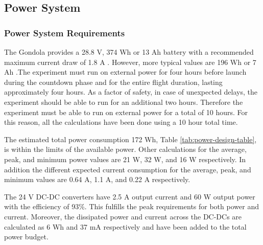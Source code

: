 \pagebreak
\subsection{Power System}

\subsubsection{Power System Requirements}
\begin{centering}
The Gondola provides a 28.8 V, 374 Wh or 13 Ah battery with a recommended maximum current draw of 1.8 A . However, more typical values are 196 Wh or 7 Ah \cite{BexusManual}.The experiment must run on external power for four hours before launch during the countdown phase and for the entire flight duration, lasting approximately four hours. As a factor of safety, in case of unexpected delays, the experiment should be able to run for an additional two hours. Therefore the experiment must be able to run on external power for a total of 10 hours. For this reason, all the calculations have been done using a 10 hour total time.
\end{centering}





The estimated total power consumption 172 Wh, Table \ref{tab:power-design-table}, is within the limits of the available power. Other calculations for the average, peak, and minimum power values are 21 W, 32 W, and 16 W respectively. In addition the different expected current consumption for the average, peak, and minimum values are 0.64 A, 1.1 A, and 0.22 A respectively.

The 24 V DC-DC converters have 2.5 A output current and 60 W output power with the efficiency of 93\%. This fulfills the peak requirements for both power and current. Moreover, the dissipated power and current across the DC-DCs are calculated as 6 Wh and 37 mA respectively and have been added to the total power budget. 



\raggedbottom
